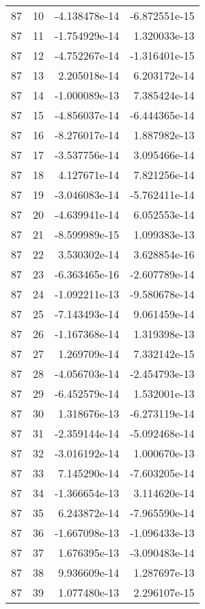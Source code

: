 \begin{tabular}{rrrr}
  87 &   10 & -4.138478e-14 & -6.872551e-15 \\
  87 &   11 & -1.754929e-14 &  1.320033e-13 \\
  87 &   12 & -4.752267e-14 & -1.316401e-15 \\
  87 &   13 &  2.205018e-14 &  6.203172e-14 \\
  87 &   14 & -1.000089e-13 &  7.385424e-14 \\
  87 &   15 & -4.856037e-14 & -6.444365e-14 \\
  87 &   16 & -8.276017e-14 &  1.887982e-13 \\
  87 &   17 & -3.537756e-14 &  3.095466e-14 \\
  87 &   18 &  4.127671e-14 &  7.821256e-14 \\
  87 &   19 & -3.046083e-14 & -5.762411e-14 \\
  87 &   20 & -4.639941e-14 &  6.052553e-14 \\
  87 &   21 & -8.599989e-15 &  1.099383e-13 \\
  87 &   22 &  3.530302e-14 &  3.628854e-16 \\
  87 &   23 & -6.363465e-16 & -2.607789e-14 \\
  87 &   24 & -1.092211e-13 & -9.580678e-14 \\
  87 &   25 & -7.143493e-14 &  9.061459e-14 \\
  87 &   26 & -1.167368e-14 &  1.319398e-13 \\
  87 &   27 &  1.269709e-14 &  7.332142e-15 \\
  87 &   28 & -4.056703e-14 & -2.454793e-13 \\
  87 &   29 & -6.452579e-14 &  1.532001e-13 \\
  87 &   30 &  1.318676e-13 & -6.273119e-14 \\
  87 &   31 & -2.359144e-14 & -5.092468e-14 \\
  87 &   32 & -3.016192e-14 &  1.000670e-13 \\
  87 &   33 &  7.145290e-14 & -7.603205e-14 \\
  87 &   34 & -1.366654e-13 &  3.114620e-14 \\
  87 &   35 &  6.243872e-14 & -7.965590e-14 \\
  87 &   36 & -1.667098e-13 & -1.096433e-13 \\
  87 &   37 &  1.676395e-13 & -3.090483e-14 \\
  87 &   38 &  9.936609e-14 &  1.287697e-13 \\
  87 &   39 &  1.077480e-13 &  2.296107e-15 \\

\end{tabular}
